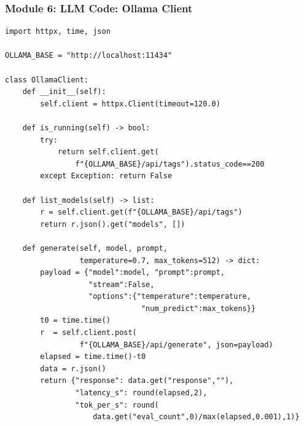 \begin{frame}[fragile]\frametitle{Module 6: LLM Code: Ollama Client}
\begin{lstlisting}
import httpx, time, json

OLLAMA_BASE = "http://localhost:11434"

class OllamaClient:
    def __init__(self):
        self.client = httpx.Client(timeout=120.0)

    def is_running(self) -> bool:
        try:
            return self.client.get(
                f"{OLLAMA_BASE}/api/tags").status_code==200
        except Exception: return False

    def list_models(self) -> list:
        r = self.client.get(f"{OLLAMA_BASE}/api/tags")
        return r.json().get("models", [])

    def generate(self, model, prompt,
                 temperature=0.7, max_tokens=512) -> dict:
        payload = {"model":model, "prompt":prompt,
                   "stream":False,
                   "options":{"temperature":temperature,
                               "num_predict":max_tokens}}
        t0 = time.time()
        r  = self.client.post(
                 f"{OLLAMA_BASE}/api/generate", json=payload)
        elapsed = time.time()-t0
        data = r.json()
        return {"response": data.get("response",""),
                "latency_s": round(elapsed,2),
                "tok_per_s": round(
                    data.get("eval_count",0)/max(elapsed,0.001),1)}
\end{lstlisting}
\end{frame}

